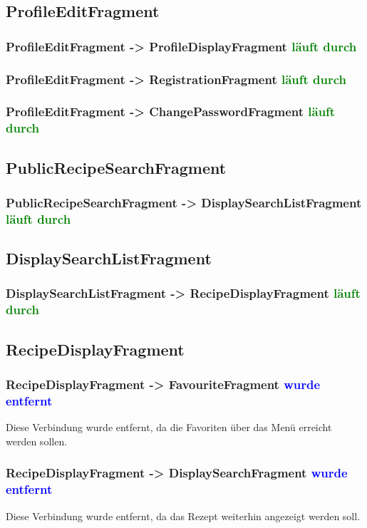 \subsection{ProfileEditFragment}
\subsubsection{ProfileEditFragment -> ProfileDisplayFragment \textcolor{green}{läuft durch}}
\subsubsection{ProfileEditFragment -> RegistrationFragment \textcolor{green}{läuft durch}}
\subsubsection{ProfileEditFragment -> ChangePasswordFragment \textcolor{green}{läuft durch}}

\subsection{PublicRecipeSearchFragment}
\subsubsection{PublicRecipeSearchFragment -> DisplaySearchListFragment \textcolor{green}{läuft durch}}


\subsection{DisplaySearchListFragment}
\subsubsection{DisplaySearchListFragment -> RecipeDisplayFragment \textcolor{green}{läuft durch}}

\subsection{RecipeDisplayFragment}
\subsubsection{RecipeDisplayFragment -> FavouriteFragment \textcolor{blue}{wurde entfernt}}
Diese Verbindung wurde entfernt, da die Favoriten über das Menü erreicht werden sollen.
\subsubsection{RecipeDisplayFragment -> DisplaySearchFragment \textcolor{blue}{wurde entfernt}}
Diese Verbindung wurde entfernt, da das Rezept weiterhin angezeigt werden soll.

